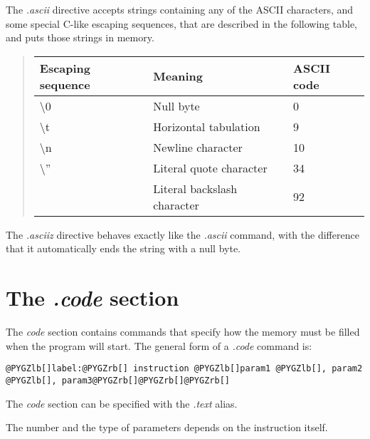 \documentclass[letterpaper,10pt,english]{sphinxmanual}
\begin{document}
The \emph{.ascii} directive accepts strings containing any of the ASCII
characters, and some special C-like escaping sequences, that are described in
the following table, and puts those strings in memory.
\begin{quote}

\begin{tabulary}{\linewidth}{|L|L|L|}
\hline
\textbf{
Escaping sequence
} & \textbf{
Meaning
} & \textbf{
ASCII code
}\\
\hline

\textbackslash{}0
 & 
Null byte
 & 
0
\\

\textbackslash{}t
 & 
Horizontal tabulation
 & 
9
\\

\textbackslash{}n
 & 
Newline character
 & 
10
\\

\textbackslash{}''
 & 
Literal quote character
 & 
34
\\
 & 
Literal backslash character
 & 
92
\\
\hline
\end{tabulary}

\end{quote}

The \emph{.asciiz} directive behaves exactly like the \emph{.ascii} command,
with the difference that it automatically ends the string with a null byte.


\section{The \emph{.code} section}
\label{source-files-format:the-code-section}
The \emph{code} section contains commands that specify how the memory must be
filled when the program will start. The general form of a \emph{.code} command
is:

\begin{Verbatim}[commandchars=@\[\]]
@PYGZlb[]label:@PYGZrb[] instruction @PYGZlb[]param1 @PYGZlb[], param2 @PYGZlb[], param3@PYGZrb[]@PYGZrb[]@PYGZrb[]
\end{Verbatim}

The \emph{code} section can be specified with the \emph{.text} alias.

The number and the type of parameters depends on the instruction itself.
\end{document}
